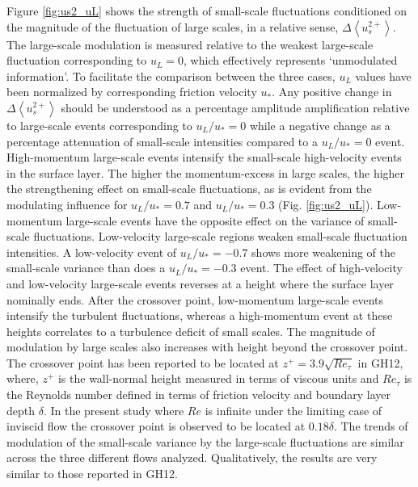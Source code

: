 Figure \ref{fig:us2_uL} shows the strength of small-scale fluctuations conditioned on the magnitude of the fluctuation of large scales, in a relative sense, $ \Delta \left < u_s^{2+}\right >$. The large-scale modulation is measured relative to the weakest large-scale fluctuation corresponding to $u_L=0$, which effectively represents `unmodulated information'. To facilitate the comparison between the three cases, $u_L$ values have been normalized by corresponding friction velocity $u_*$. Any positive change in $ \Delta \left < u_s^{2+}\right >$ should be understood as a percentage amplitude amplification relative to large-scale events corresponding to $u_L/u_*=0$ while a negative change as a percentage attenuation of small-scale intensities compared to a $u_L/u_*=0$ event.  High-momentum large-scale events intensify the small-scale high-velocity events in the surface layer. The higher the momentum-excess in large scales, the higher the strengthening effect on small-scale fluctuations, as is evident from the modulating influence for $u_L/u_*=0.7$ and $u_L/u_*=0.3$ (Fig. \ref{fig:us2_uL}).  Low-momentum large-scale events have the opposite effect on the variance of small-scale fluctuations. Low-velocity large-scale regions  weaken small-scale fluctuation intensities. A low-velocity event of $u_L/u_*=-0.7$ shows more weakening of the small-scale variance than does a $u_L/u_*=-0.3$ event. The effect of high-velocity and low-velocity large-scale events reverses at a height where the surface layer nominally ends. After the crossover point, low-momentum large-scale events intensify the turbulent fluctuations, whereas a high-momentum event at these heights correlates to a turbulence deficit of small scales. The magnitude of modulation by large scales also increases with height beyond the crossover point. The crossover point has been reported to be located at $z^{+}=3.9\sqrt{Re_{\tau}}$ in GH12, where, $z^{+}$ is the wall-normal height measured in terms of viscous units and $Re_{\tau}$ is the Reynolds number defined in terms of friction velocity and boundary layer depth $\delta$. In the present study where $Re$ is infinite under the limiting case of inviscid flow the crossover point is observed to be located at $0.18\delta$. The trends of modulation of the small-scale variance by the large-scale fluctuations are similar across the three different flows analyzed. Qualitatively, the results are very similar to those reported in GH12.

